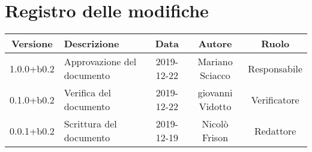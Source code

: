 \section*{Registro delle modifiche}

\begin{center}
	\begin{longtable}{|c|p{3cm}|c|c|c|}
	\hline
	\rowcolor{lighter-grayer}
	\textbf{Versione} & \textbf{Descrizione} & \textbf{Data} & \textbf{Autore} & \textbf{Ruolo} \\
	\hline
	\endfirsthead


	1.0.0+b0.2 & Approvazione del documento & 2019-12-22 & Mariano Sciacco & Responsabile \\
	\hline
	0.1.0+b0.2 & Verifica del documento & 2019-12-22 & giovanni Vidotto & Verificatore \\
	\hline
	0.0.1+b0.2 & Scrittura del documento & 2019-12-19 & Nicolò Frison & Redattore \\
	\hline

	\end{longtable}
\end{center}